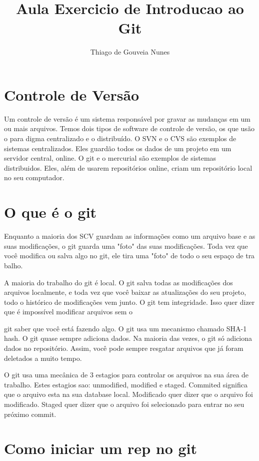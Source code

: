 \documentclass{article}
\begin{document}
\title{Aula Exercicio de Introducao ao Git}
\author{Thiago de Gouveia Nunes}
\maketitle

\section{Controle de Versão}
    Um controle de versão é um sistema responsável por gravar as mudanças em um
    ou mais arquivos.
    Temos dois tipos de software de controle de versão, os que usão o para
    digma centralizado e o distribuído. O SVN e o CVS são exemplos de sistemas
    centralizados. Eles guardão todos os dados de um projeto em um servidor central,
    online. O git e o mercurial são exemplos de sistemas distribuidos. Eles, além
    de usarem repositórios online, criam um repositório local no seu computador.

\section{O que é o git}
    Enquanto a maioria dos SCV guardam as informações como um arquivo base e as suas
    modificações, o git guarda uma "foto" das suas modificações. Toda vez que você
    modifica ou salva algo no git, ele tira uma "foto" de todo o seu espaço de tra
    balho.
    
    A maioria do trabalho do git é local. O git salva todas as modificações dos arquivos
    localmente, e toda vez que você baixar as atualizações do seu projeto, todo o
    histórico de modificações vem junto.
    O git tem integridade. Isso quer dizer que é impossível modificar arquivos sem o
    
    git saber que você está fazendo algo. O git usa um mecanismo chamado SHA-1 hash.
    O git quase sempre adiciona dados. Na maioria das vezes, o git só adiciona dados
    no repositório. Assim, você pode sempre resgatar arquivos que já foram deletados
    a muito tempo.
    
    O git usa uma mecânica de 3 estagios para controlar os arquivos na sua área de
    trabalho. Estes estagios sao: unmodified, modified e staged. Commited significa
    que o arquivo esta na sua database local. Modificado quer dizer que o arquivo
    foi modificado. Staged quer dizer que o arquivo foi selecionado para entrar no seu
    próximo commit.

\section{Como iniciar um rep no git}
\end{document}
